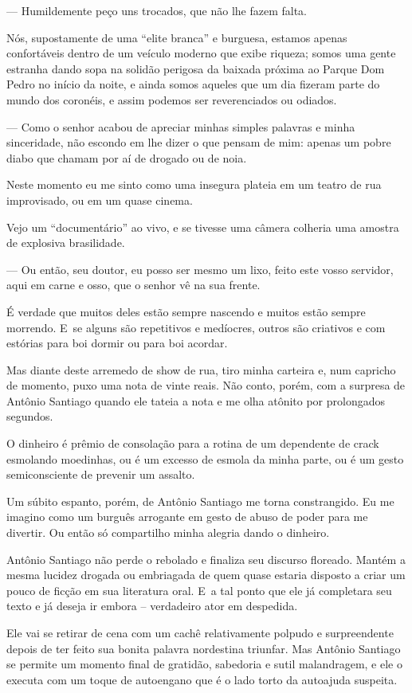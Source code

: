 — Humildemente peço uns trocados, que não lhe fazem falta.

Nós, supostamente de uma ``elite branca'' e burguesa, estamos apenas
confortáveis dentro de um veículo moderno que exibe riqueza; somos uma
gente estranha dando sopa na solidão perigosa da baixada próxima ao
Parque Dom Pedro no início da noite, e ainda somos aqueles que um dia
fizeram parte do mundo dos coronéis, e assim podemos ser reverenciados
ou odiados.

— Como o senhor acabou de apreciar minhas simples palavras e minha
sinceridade, não escondo em lhe dizer o que pensam de mim: apenas um
pobre diabo que chamam por aí de drogado ou de noia.

Neste momento eu me sinto como uma insegura plateia em um teatro de rua
improvisado, ou em um quase cinema.

Vejo um ``documentário'' ao vivo, e se tivesse uma câmera colheria uma
amostra de explosiva brasilidade.

— Ou então, seu doutor, eu posso ser mesmo um lixo, feito este vosso
servidor, aqui em carne e osso, que o senhor vê na sua frente.

É verdade que muitos deles estão sempre nascendo e muitos estão sempre
morrendo. E~se alguns são repetitivos e medíocres, outros são criativos
e com estórias para boi dormir ou para boi acordar.

Mas diante deste arremedo de show de rua, tiro minha carteira e, num
capricho de momento, puxo uma nota de vinte reais. Não conto, porém, com
a surpresa de Antônio Santiago quando ele tateia a nota e me olha
atônito por prolongados segundos.

O dinheiro é prêmio de consolação para a rotina de um dependente de
crack esmolando moedinhas, ou é um excesso de esmola da minha parte, ou
é um gesto semiconsciente de prevenir um assalto.

Um súbito espanto, porém, de Antônio Santiago me torna constrangido. Eu
me imagino como um burguês arrogante em gesto de abuso de poder para me
divertir. Ou então só compartilho minha alegria dando o dinheiro.

Antônio Santiago não perde o rebolado e finaliza seu discurso floreado.
Mantém a mesma lucidez drogada ou embriagada de quem quase estaria
disposto a criar um pouco de ficção em sua literatura oral. E~a tal
ponto que ele já completara seu texto e já deseja ir embora --
verdadeiro ator em despedida.

\asterisc{}

Ele vai se retirar de cena com um cachê relativamente polpudo e
surpreendente depois de ter feito sua bonita palavra nordestina
triunfar. Mas Antônio Santiago se permite um momento final de gratidão,
sabedoria e sutil malandragem, e ele o executa com um toque de
autoengano que é o lado torto da autoajuda suspeita.

